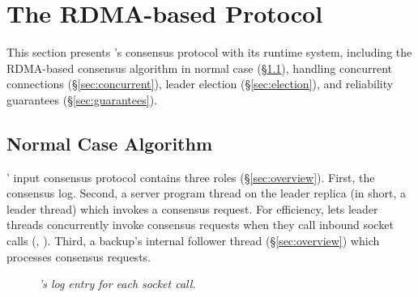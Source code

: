 \section{The RDMA-based \paxos Protocol} \label{sec:input}

This section presents \xxx's consensus protocol with its runtime system, 
including the RDMA-based consensus algorithm in normal case 
(\S\ref{sec:normal}), handling concurrent connections (\S\ref{sec:concurrent}), 
leader election (\S\ref{sec:election}), and reliability guarantees 
(\S\ref{sec:guarantees}).

\subsection{Normal Case Algorithm} \label{sec:normal}





\xxx' input consensus protocol contains three roles (\S\ref{sec:overview}). 
First, the \paxos consensus log. Second, a server program thread on the leader 
replica (in short, a leader thread) which invokes a consensus request. For 
efficiency, \xxx lets leader threads concurrently invoke consensus requests 
when they call inbound socket calls (\eg, \recv). Third, a backup's 
\xxx internal follower thread (\S\ref{sec:overview}) which processes 
consensus requests.

\begin{figure}[h]
\vspace{-.2in}
\centering
\begin{minipage}{.5\textwidth}
\end{minipage}
\vspace{-.05in}
\caption{{\em \xxx's log entry for each socket call.}} \label{fig:logentry}
\vspace{-.1in}
\end{figure}

